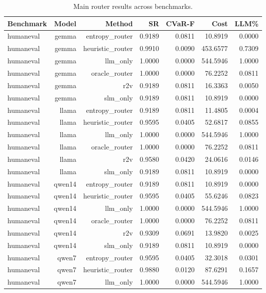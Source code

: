 \begin{table}[t]
\centering
\caption{Main router results across benchmarks.}
\label{tab:router-main-results}
\begin{tabular}{lrrrrrr}
\hline
Benchmark & Model & Method & SR & CVaR-F & Cost & LLM\% \\
\hline
humaneval & gemma & entropy_router & 0.9189 & 0.0811 & 10.8919 & 0.0000 \\
humaneval & gemma & heuristic_router & 0.9910 & 0.0090 & 453.6577 & 0.7309 \\
humaneval & gemma & llm_only & 1.0000 & 0.0000 & 544.5946 & 1.0000 \\
humaneval & gemma & oracle_router & 1.0000 & 0.0000 & 76.2252 & 0.0811 \\
humaneval & gemma & r2v & 0.9189 & 0.0811 & 16.3363 & 0.0050 \\
humaneval & gemma & slm_only & 0.9189 & 0.0811 & 10.8919 & 0.0000 \\
humaneval & llama & entropy_router & 0.9189 & 0.0811 & 11.4805 & 0.0004 \\
humaneval & llama & heuristic_router & 0.9595 & 0.0405 & 52.6817 & 0.0855 \\
humaneval & llama & llm_only & 1.0000 & 0.0000 & 544.5946 & 1.0000 \\
humaneval & llama & oracle_router & 1.0000 & 0.0000 & 76.2252 & 0.0811 \\
humaneval & llama & r2v & 0.9580 & 0.0420 & 24.0616 & 0.0146 \\
humaneval & llama & slm_only & 0.9189 & 0.0811 & 10.8919 & 0.0000 \\
humaneval & qwen14 & entropy_router & 0.9189 & 0.0811 & 10.8919 & 0.0000 \\
humaneval & qwen14 & heuristic_router & 0.9595 & 0.0405 & 55.6246 & 0.0823 \\
humaneval & qwen14 & llm_only & 1.0000 & 0.0000 & 544.5946 & 1.0000 \\
humaneval & qwen14 & oracle_router & 1.0000 & 0.0000 & 76.2252 & 0.0811 \\
humaneval & qwen14 & r2v & 0.9309 & 0.0691 & 13.9820 & 0.0025 \\
humaneval & qwen14 & slm_only & 0.9189 & 0.0811 & 10.8919 & 0.0000 \\
humaneval & qwen7 & entropy_router & 0.9595 & 0.0405 & 32.3018 & 0.0301 \\
humaneval & qwen7 & heuristic_router & 0.9880 & 0.0120 & 87.6291 & 0.1657 \\
humaneval & qwen7 & llm_only & 1.0000 & 0.0000 & 544.5946 & 1.0000 \\

\end{tabular}
\end{table}
